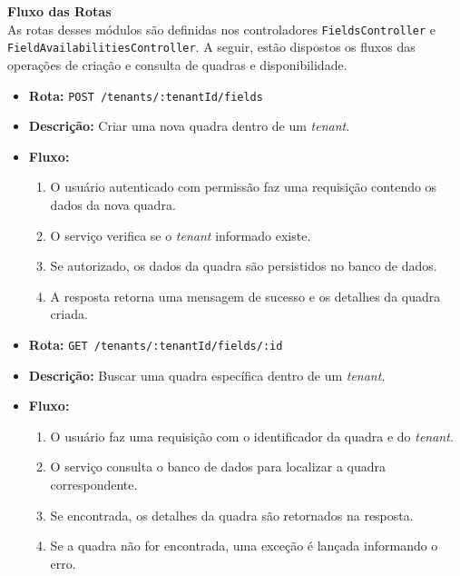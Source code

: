 \textbf{Fluxo das Rotas}\\
As rotas desses módulos são definidas nos controladores \texttt{FieldsController} e \texttt{FieldAvailabilitiesController}. A seguir, estão dispostos os fluxos das operações de criação e consulta de quadras e disponibilidade.

\begin{itemize}
    \item \textbf{Rota:} \texttt{POST /tenants/:tenantId/fields}
    \item \textbf{Descrição:} Criar uma nova quadra dentro de um \textit{tenant}.
    \item \textbf{Fluxo:}
    \begin{enumerate}
        \item O usuário autenticado com permissão faz uma requisição contendo os dados da nova quadra.
        \item O serviço verifica se o \textit{tenant} informado existe.
        \item Se autorizado, os dados da quadra são persistidos no banco de dados.
        \item A resposta retorna uma mensagem de sucesso e os detalhes da quadra criada.
    \end{enumerate}
\end{itemize}

\begin{itemize}
    \item \textbf{Rota:} \texttt{GET /tenants/:tenantId/fields/:id}
    \item \textbf{Descrição:} Buscar uma quadra específica dentro de um \textit{tenant}.
    \item \textbf{Fluxo:}
    \begin{enumerate}
        \item O usuário faz uma requisição com o identificador da quadra e do \textit{tenant}.
        \item O serviço consulta o banco de dados para localizar a quadra correspondente.
        \item Se encontrada, os detalhes da quadra são retornados na resposta.
        \item Se a quadra não for encontrada, uma exceção é lançada informando o erro.
    \end{enumerate}
\end{itemize}

